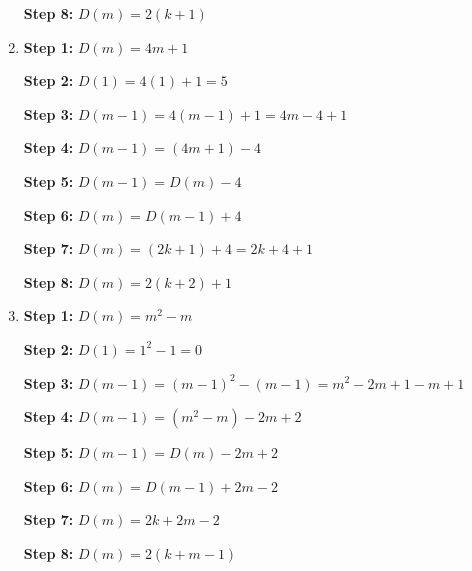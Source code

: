 \begin{enumerate}
        \textbf{Step 8:}
                $D(m) = 2(k + 1)$

    \item
        \textbf{Step 1:}
                $D(m) = 4m+1$
        
        \textbf{Step 2:}
                $D(1) = 4(1) + 1 = 5$ \checkmark
        
        \textbf{Step 3:}
                $D(m-1) = 4(m-1) + 1 = 4m - 4 + 1$
        
        \textbf{Step 4:}
                $D(m-1) = (4m + 1) - 4$
        
        \textbf{Step 5:}
                $D(m-1) = D(m) - 4$
        
        \textbf{Step 6:}
                $D(m) = D(m-1) + 4$
        
        \textbf{Step 7:}
                $D(m) = (2k+1) + 4 = 2k + 4 + 1$
        
        \textbf{Step 8:}
                $D(m) = 2(k + 2) + 1$

    \item
        \textbf{Step 1:}
                $D(m) = m^{2} - m$
        
        \textbf{Step 2:}
                $D(1) = 1^{2} - 1 = 0$ \checkmark
        
        \textbf{Step 3:}
                $D(m-1) = (m-1)^{2} - (m-1) = m^{2} - 2m + 1 - m + 1$
        
        \textbf{Step 4:}
                $D(m-1) = (m^{2} - m) - 2m + 2$
        
        \textbf{Step 5:}
                $D(m-1) = D(m) - 2m  + 2$
        
        \textbf{Step 6:}
                $D(m) = D(m-1) + 2m - 2$
        
        \textbf{Step 7:}
                $D(m) = 2k + 2m - 2$
        
        \textbf{Step 8:}
                $D(m) = 2(k + m - 1)$
\end{enumerate}

        

